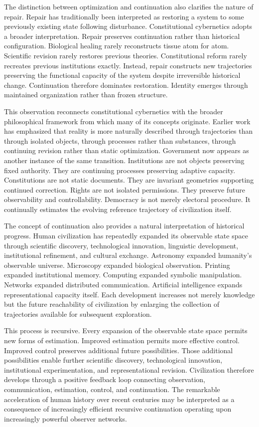 \documentclass[12pt,a4paper]{article}
\begin{document}
The distinction between optimization and continuation also clarifies the nature of repair. Repair has traditionally been interpreted as restoring a system to some previously existing state following disturbance. Constitutional cybernetics adopts a broader interpretation. Repair preserves continuation rather than historical configuration. Biological healing rarely reconstructs tissue atom for atom. Scientific revision rarely restores previous theories. Constitutional reform rarely recreates previous institutions exactly. Instead, repair constructs new trajectories preserving the functional capacity of the system despite irreversible historical change. Continuation therefore dominates restoration. Identity emerges through maintained organization rather than frozen structure.

This observation reconnects constitutional cybernetics with the broader philosophical framework from which many of its concepts originate. Earlier work has emphasized that reality is more naturally described through trajectories than through isolated objects, through processes rather than substances, through continuing revision rather than static optimization. Government now appears as another instance of the same transition. Institutions are not objects preserving fixed authority. They are continuing processes preserving adaptive capacity. Constitutions are not static documents. They are invariant geometries supporting continued correction. Rights are not isolated permissions. They preserve future observability and controllability. Democracy is not merely electoral procedure. It continually estimates the evolving reference trajectory of civilization itself.

The concept of continuation also provides a natural interpretation of historical progress. Human civilization has repeatedly expanded its observable state space through scientific discovery, technological innovation, linguistic development, institutional refinement, and cultural exchange. Astronomy expanded humanity's observable universe. Microscopy expanded biological observation. Printing expanded institutional memory. Computing expanded symbolic manipulation. Networks expanded distributed communication. Artificial intelligence expands representational capacity itself. Each development increases not merely knowledge but the future reachability of civilization by enlarging the collection of trajectories available for subsequent exploration.

This process is recursive. Every expansion of the observable state space permits new forms of estimation. Improved estimation permits more effective control. Improved control preserves additional future possibilities. Those additional possibilities enable further scientific discovery, technological innovation, institutional experimentation, and representational revision. Civilization therefore develops through a positive feedback loop connecting observation, communication, estimation, control, and continuation. The remarkable acceleration of human history over recent centuries may be interpreted as a consequence of increasingly efficient recursive continuation operating upon increasingly powerful observer networks.
\end{document}
